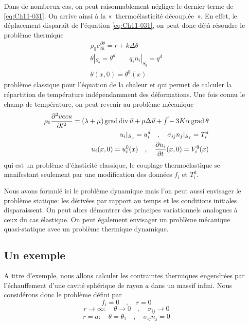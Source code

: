 Dans de nombreux cas, on peut raisonnablement négliger le dernier terme de \eqref{eq:Ch11-031}.
On arrive ainsi à la «~thermoélasticité découplée~».
En effet, le déplacement disparaît de l'équation \eqref{eq:Ch11-031}, on peut donc déjà résoudre le problème thermique 
\begin{equation}
  \begin{aligned}
    \rho_0 c \frac{\partial \theta}{\partial t} = r + k\Delta \theta \\
    \theta|_{S_\theta} = \theta^d \quad\quad  q_in_i|_{S_q} = q^d \\
    \theta (x,0) = \theta^0(x)
  \end{aligned}
    \label{eq:Ch11-032}
\end{equation}
problème classique pour l'équation de la chaleur et qui permet de calculer la répartition de température indépendamment des déformations.
Une fois connu le champ de température, on peut revenir au problème mécanique 
\begin{equation}
  \begin{aligned}
    \rho_0 \frac{\partial^2 vec{u}}{\partial t^2} = (\lambda + \mu) \operatorname*{\mathrm{grad}} \operatorname*{\mathrm{div}} \vec{u} + \mu \Delta \vec{u} +\vec{f} - 3 K \alpha \operatorname*{\mathrm{grad}} \theta \\
    u_i|_{S_u} = u_i^d \quad,\quad  \sigma_{ij}n_j|_{S_f} = T_i^d \\
    u_i(x,0)= u_i^0(x) \quad,\quad  \frac{\partial u_i}{\partial t}(x,0) = V_i^0(x)
  \end{aligned}
    \label{eq:Ch11-033}
\end{equation}
qui est un problème d'élasticité classique, le couplage thermoélastique se 
manifestant seulement par une modification des données $f_i$ et $T_i^d$. 

Nous avons formulé ici le problème dynamique mais l'on peut aussi envisager le problème statique: les dérivées par rapport au temps et les conditions initiales disparaissent.
On peut alors démontrer des principes variationnels analogues à ceux du cas élastique.
On peut également envisager un problème mécanique quasi-statique avec un problème thermique dynamique. 

\subsection{Un exemple}\label{ssec:Ch11-2.2}
A titre d'exemple, nous allons calculer les contraintes thermiques engendrées par l'échauffement d'une cavité sphérique de rayon $a$ dans un massif infini.
Nous considérons donc le problème défini par 
\begin{equation}
    f_i = 0 \quad,\quad r=0
    \label{eq:Ch11-034}
\end{equation}
\begin{equation}
    r \rightarrow \infty: \quad \theta \rightarrow 0 \quad,\quad \sigma_{ij}\rightarrow 0
    \label{eq:Ch11-035}
\end{equation}
\begin{equation}
    r =a: \quad \theta=\theta_1 \quad,\quad \sigma_{ij}n_j = 0
    \label{eq:Ch11-036}
\end{equation}


